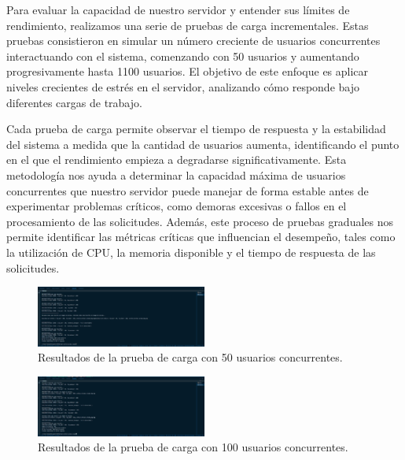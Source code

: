 Para evaluar la capacidad de nuestro servidor y entender sus límites de rendimiento, realizamos una serie de pruebas de carga incrementales. Estas pruebas consistieron en simular un número creciente de usuarios concurrentes interactuando con el sistema, comenzando con 50 usuarios y aumentando progresivamente hasta 1100 usuarios. El objetivo de este enfoque es aplicar niveles crecientes de estrés en el servidor, analizando cómo responde bajo diferentes cargas de trabajo.

Cada prueba de carga permite observar el tiempo de respuesta y la estabilidad del sistema a medida que la cantidad de usuarios aumenta, identificando el punto en el que el rendimiento empieza a degradarse significativamente. Esta metodología nos ayuda a determinar la capacidad máxima de usuarios concurrentes que nuestro servidor puede manejar de forma estable antes de experimentar problemas críticos, como demoras excesivas o fallos en el procesamiento de las solicitudes. Además, este proceso de pruebas graduales nos permite identificar las métricas críticas que influencian el desempeño, tales como la utilización de CPU, la memoria disponible y el tiempo de respuesta de las solicitudes.

\newpage

\begin{figure}[H]
    \centering
    \includegraphics[width=0.5\textwidth]{figuras/pruebaCarga50U.png}
    \caption{Resultados de la prueba de carga con 50 usuarios concurrentes.}
    \label{fig:pruebaCarga50U}
\end{figure}

\begin{figure}[H]
    \centering
    \includegraphics[width=0.5\textwidth]{figuras/pruebaCarga100U.png}
    \caption{Resultados de la prueba de carga con 100 usuarios concurrentes.}
    \label{fig:pruebaCarga100U}
\end{figure}

